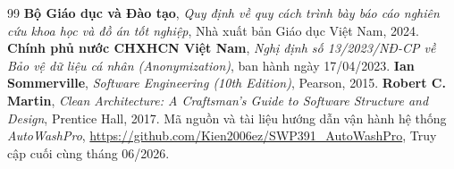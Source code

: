 \documentclass[12pt,a4paper,oneside]{report}
\begin{document}


\clearpage

\setcounter{page}{1}


\newpage
\cleardoublepage

\begin{thebibliography}{99}
 \textbf{Bộ Giáo dục và Đào tạo}, \textit{Quy định về quy cách trình bày báo cáo nghiên cứu khoa học và đồ án tốt nghiệp}, Nhà xuất bản Giáo dục Việt Nam, 2024.
 \textbf{Chính phủ nước CHXHCN Việt Nam}, \textit{Nghị định số 13/2023/NĐ-CP về Bảo vệ dữ liệu cá nhân (Anonymization)}, ban hành ngày 17/04/2023.
 \textbf{Ian Sommerville}, \textit{Software Engineering (10th Edition)}, Pearson, 2015.
 \textbf{Robert C. Martin}, \textit{Clean Architecture: A Craftsman's Guide to Software Structure and Design}, Prentice Hall, 2017.
 Mã nguồn và tài liệu hướng dẫn vận hành hệ thống \textit{AutoWashPro}, \url{https://github.com/Kien2006ez/SWP391_AutoWashPro}, Truy cập cuối cùng tháng 06/2026.
\end{thebibliography}
\end{document}
